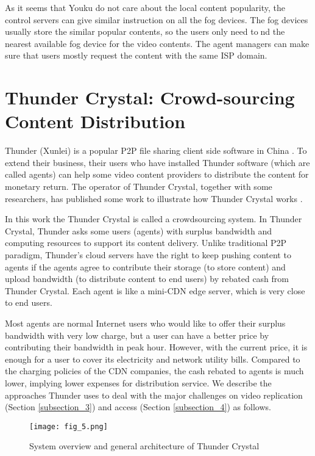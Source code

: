 As it seems that Youku do not care about the local content popularity, the control servers
can give similar instruction on all the fog devices. The fog devices usually store the similar
popular contents, so the users only need tond the nearest available fog device for the video
contents. The agent managers can make sure that users mostly request the content with the
same ISP domain.

\section{Thunder Crystal: Crowd-sourcing Content Distribution}

Thunder (Xunlei) is a popular P2P file sharing client side software in China \citep{Dhungel2011Measurement} \citep{Dhungel2012Xunlei}. To
extend their business, their users who have installed Thunder software (which are called
agents) can help some video content providers to distribute the content for monetary return.
The operator of Thunder Crystal, together with some researchers, has published some work
to illustrate how Thunder Crystal works \citep{Chen2015Thunder}.

In this work \citep{Chen2015Thunder} the Thunder Crystal is called a crowdsourcing system. In Thunder Crystal,
 Thunder asks some users (agents) with surplus bandwidth and computing resources to
support its content delivery. Unlike traditional P2P paradigm, Thunder's cloud servers have
the right to keep pushing content to agents if the agents agree to contribute their storage (to
store content) and upload bandwidth (to distribute content to end users) by rebated cash
from Thunder Crystal. Each agent is like a mini-CDN edge server, which is very close to end
users.

Most agents are normal Internet users who would like to offer their surplus bandwidth
with very low charge, but a user can have a better price by contributing their bandwidth in
peak hour. However, with the current price, it is enough for a user to cover its electricity
and network utility bills. Compared to the charging policies of the CDN companies, the
cash rebated to agents is much lower, implying lower expenses for distribution service. We
describe the approaches Thunder uses to deal with the major challenges on video replication
(Section \ref{subsection_3}) and access (Section \ref{subsection_4}) as follows.
\begin{figure}[htbp]
\centering
	  \texttt{[image: fig\_5.png]}
    \caption{System overview and general architecture of Thunder Crystal}
 \label{fig_5}
\end{figure}


